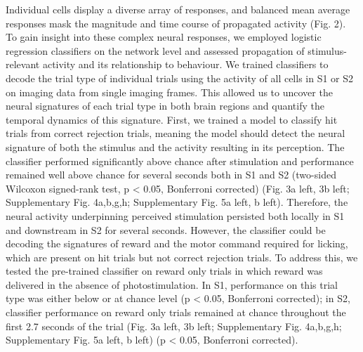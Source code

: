 Individual cells display a diverse array of responses, and balanced mean average responses mask the magnitude and time course of propagated activity (Fig. 2). To gain insight into these complex neural responses, we employed logistic regression classifiers on the network level and assessed propagation of stimulus-relevant activity and its relationship to behaviour. We trained classifiers to decode the trial type of individual trials using the activity of all cells in S1 or S2 on imaging data from single imaging frames. This allowed us to uncover the neural signatures of each trial type in both brain regions and quantify the temporal dynamics of this signature. First, we trained a model to classify hit trials from correct rejection trials, meaning the model should detect the neural signature of both the stimulus and the activity resulting in its perception. The classifier performed significantly above chance after stimulation and performance remained well above chance for several seconds both in S1 and S2 (two-sided Wilcoxon signed-rank test, p < 0.05, Bonferroni corrected) (Fig. 3a left, 3b left; Supplementary Fig. 4a,b,g,h; Supplementary Fig. 5a left, b left). Therefore, the neural activity underpinning perceived stimulation persisted both locally in S1 and downstream in S2 for several seconds. However, the classifier could be decoding the signatures of reward and the motor command required for licking, which are present on hit trials but not correct rejection trials. To address this, we tested the pre-trained classifier on reward only trials in which reward was delivered in the absence of photostimulation. In S1, performance on this trial type was either below or at chance level (p < 0.05, Bonferroni corrected); in S2, classifier performance on reward only trials remained at chance throughout the first 2.7 seconds of the trial (Fig. 3a left, 3b left; Supplementary Fig. 4a,b,g,h; Supplementary Fig. 5a left, b left) (p < 0.05, Bonferroni corrected). 



